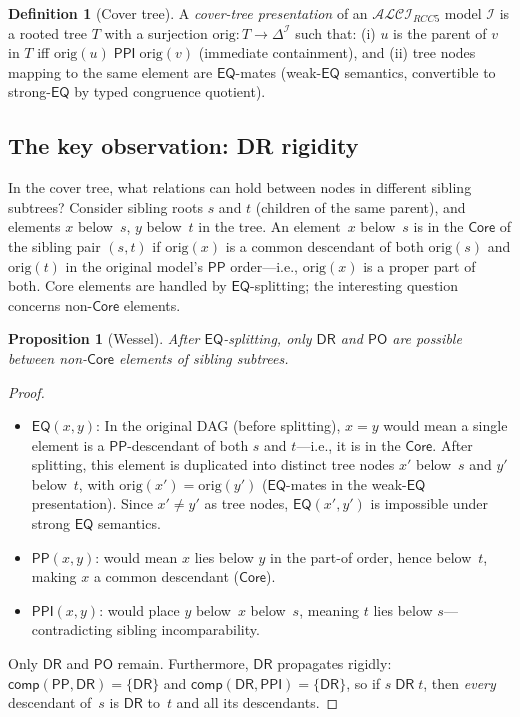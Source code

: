 \documentclass[
]{ceurart}
\newtheorem{proposition}[theorem]{Proposition}
\theoremstyle{definition}
\newtheorem{definition}[theorem]{Definition}
\newcommand{\ALCIRCC}[1]{\ensuremath{\mathcal{ALCI}_{\mathit{RCC#1}}}}
\newcommand{\DR}{\ensuremath{\mathsf{DR}}}
\newcommand{\PO}{\ensuremath{\mathsf{PO}}}
\newcommand{\EQ}{\ensuremath{\mathsf{EQ}}}
\newcommand{\PP}{\ensuremath{\mathsf{PP}}}
\newcommand{\PPI}{\ensuremath{\mathsf{PPI}}}
\newcommand{\comp}{\ensuremath{\mathsf{comp}}}
\newcommand{\Core}{\ensuremath{\mathsf{Core}}}
\begin{document}
\begin{definition}[Cover tree]
A \emph{cover-tree presentation} of an $\ALCIRCC{5}$ model
$\mathcal{I}$ is a rooted tree $T$ with a surjection
$\mathrm{orig}: T \to \Delta^{\mathcal{I}}$ such that:
(i) $u$ is the parent of $v$ in $T$ iff
$\mathrm{orig}(u) \;\PPI\; \mathrm{orig}(v)$ (immediate containment),
and (ii) tree nodes mapping to the same element are $\EQ$-mates
(weak-$\EQ$ semantics, convertible to strong-$\EQ$ by typed
congruence quotient).
\end{definition}

\subsection{The key observation: DR rigidity}

In the cover tree, what relations can hold between nodes in
different sibling subtrees?  Consider sibling roots $s$ and $t$
(children of the same parent), and elements $x$ below~$s$, $y$
below~$t$ in the tree.
An element~$x$ below~$s$ is in the \emph{$\Core$} of the sibling
pair $(s,t)$ if $\mathrm{orig}(x)$ is a common descendant of both
$\mathrm{orig}(s)$ and $\mathrm{orig}(t)$ in the original model's
$\PP$ order---i.e., $\mathrm{orig}(x)$ is a proper part of both.
Core elements are handled by $\EQ$-splitting; the interesting
question concerns non-$\Core$ elements.

\begin{proposition}[Wessel]
\label{prop:dr-rigid}
After $\EQ$-splitting, only $\DR$ and $\PO$ are possible between
non-$\Core$ elements of sibling subtrees.
\end{proposition}

\begin{proof}
\begin{itemize}[nosep]
  \item $\EQ(x,y)$: In the original DAG (before splitting),
    $x = y$ would mean a single element is a $\PP$-descendant of
    both $s$ and $t$---i.e., it is in the $\Core$.
    After splitting, this element is duplicated into
    distinct tree nodes $x'$ below~$s$ and $y'$ below~$t$,
    with $\mathrm{orig}(x') = \mathrm{orig}(y')$
    ($\EQ$-mates in the weak-$\EQ$ presentation).
    Since $x' \neq y'$ as tree nodes, $\EQ(x',y')$ is
    impossible under strong $\EQ$ semantics.
  \item $\PP(x,y)$: would mean $x$ lies below $y$ in the part-of
    order, hence below~$t$, making $x$ a common descendant
    ($\Core$).
  \item $\PPI(x,y)$: would place $y$ below~$x$ below~$s$, meaning
    $t$ lies below $s$---contradicting sibling incomparability.
\end{itemize}
Only $\DR$ and $\PO$ remain.  Furthermore, $\DR$ propagates
rigidly: $\comp(\PP, \DR) = \{\DR\}$ and $\comp(\DR, \PPI) = \{\DR\}$,
so if $s \;\DR\; t$, then \emph{every} descendant of~$s$ is $\DR$
to~$t$ and all its descendants.
\end{proof}
\end{document}
